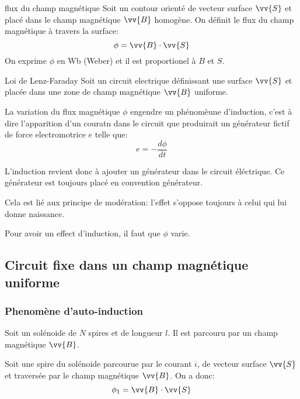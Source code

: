 \begin{definition}{flux du champ magnétique}{}
    Soit un contour orienté de vecteur surface $\vv{S}$ et placé dans le champ magnétique $\vv{B}$ homogène. On définit le flux du champ magnétique à travers la surface:
    \[ \phi = \vv{B} \cdot \vv{S} \]
    On exprime $\phi$ en Wb (Weber) et il est proportionel à $B$ et $S$.
\end{definition}

\begin{proposition}{Loi de Lenz-Faraday}{}
    Soit un circuit electrique définissant une surface $\vv{S}$ et placée dans une zone de champ magnétique $\vv{B}$ uniforme.

    La variation du flux magnétique $\phi$ engendre un phénomèune d'induction, c'est à dire l'apparition d'un couratn dans le circuit que produirait un générateur fictif de force electromotrice $e$ telle que:
    \[ e = - \frac{d\phi}{dt} \]
\end{proposition}

L'induction revient donc à ajouter un générateur dans le circuit éléctrique. Ce générateur est toujours placé en convention générateur.

Cela est lié aux principe de modération: l'effet s'oppose toujours à celui qui lui donne naissance.

\begin{remark}{}{}
    Pour avoir un effect d'induction, il faut que $\phi$ varie.
\end{remark}





\subsection{Circuit fixe dans un champ magnétique uniforme}

\subsubsection{Phenomène d'auto-induction}

Soit un solénoide de $N$ spires et de longueur $l$. Il est parcouru par un champ magnétique $\vv{B}$.

Soit une spire du solénoide parcourue par le courant $i$, de vecteur surface $\vv{S}$ et traversée par le champ magnétique $\vv{B}$. On a donc:
\[ \phi_1 = \vv{B} \cdot \vv{S} \]

